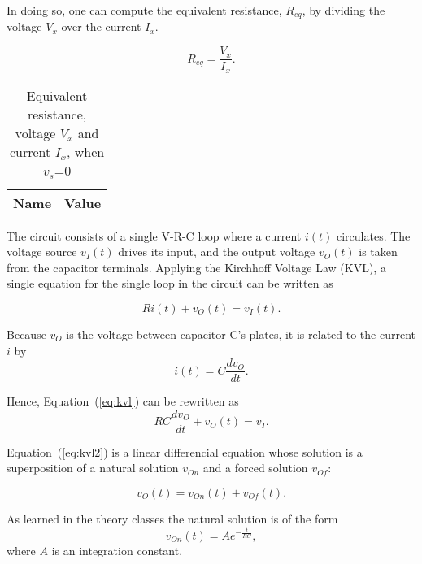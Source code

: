 In doing so, one can compute the equivalent resistance, $R_{eq}$, by dividing the
voltage $V_x$ over the current $I_x$.

\begin{equation}
  R_{eq} = \frac{V_x}{I_x}.
  \label{eq:R_eq}
\end{equation}

\begin{table} [H]
  \centering
  \begin{tabular}{|l|r|}
    \hline    
    {\bf Name} & {\bf Value} \\ \hline
    
  \end{tabular}
  \caption{Equivalent resistance, voltage $V_x$ and current $I_x$, when $v_s$=0}
  \label{tab:req}
\end{table}








The circuit consists of a single V-R-C loop where a current $i(t)$ circulates. The
voltage source $v_I(t)$ drives its input, and the output voltage $v_O(t)$ is taken from
the capacitor terminals. Applying the Kirchhoff Voltage Law (KVL), a single
equation for the single loop in the circuit can be written as

\begin{equation}
  Ri(t) + v_O(t) = v_I(t).
  \label{eq:kvl}
\end{equation}

Because $v_O$ is the voltage between capacitor C's plates, it is related to the
current $i$ by
\begin{equation}
  i(t) = C\frac{dv_O}{dt}.
\end{equation}

Hence, Equation~(\ref{eq:kvl}) can be rewritten as
\begin{equation}
  RC\frac{dv_O}{dt} + v_O(t) = v_I.
  \label{eq:kvl2}
\end{equation}

Equation~(\ref{eq:kvl2}) is a linear differencial equation whose solution is a
superposition of a natural solution $v_{On}$ and a forced solution $v_{Of}$:

\begin{equation}
  v_O(t) = v_{On}(t) + v_{Of}(t).
  \label{eq:vo_sol}
\end{equation}

As learned in the theory classes the natural solution is of the form
\begin{equation}
  v_{On}(t) = Ae^{-\frac{t}{RC}},
  \label{eq:vo_nat}
\end{equation}
where $A$ is an integration constant.

